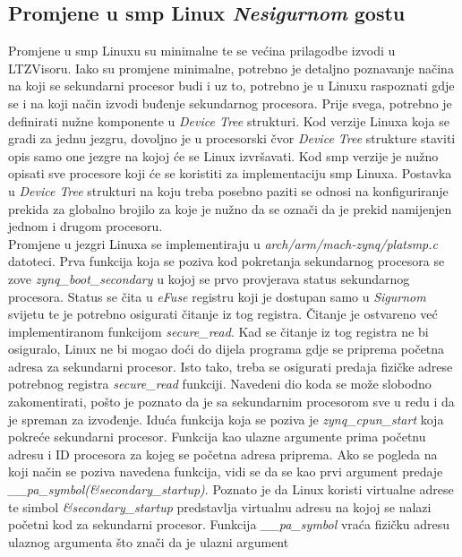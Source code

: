 \documentclass[times, utf8, diplomski, numeric]{fer}
\begin{document}
\subsection{Promjene u \gls{smp} Linux \textit{Nesigurnom} gostu}
Promjene u \gls{smp} Linuxu su minimalne te se većina prilagodbe izvodi u LTZVisoru. Iako su promjene minimalne, potrebno je detaljno
poznavanje načina na koji se sekundarni procesor budi i uz to, potrebno je u Linuxu raspoznati gdje se i na koji način izvodi
buđenje sekundarnog procesora. Prije svega, potrebno je definirati nužne komponente u \textit{Device Tree} strukturi. Kod
verzije Linuxa koja se gradi za jednu jezgru, dovoljno je u procesorski čvor \textit{Device Tree} strukture staviti opis
samo one jezgre na kojoj će se Linux izvršavati. Kod \gls{smp} verzije je nužno opisati sve procesore koji će se koristiti za
implementaciju \gls{smp} Linuxa. Postavka u \textit{Device Tree} strukturi na koju treba posebno paziti se odnosi na konfiguriranje
prekida za globalno brojilo za koje je nužno da se označi da je prekid namijenjen jednom i drugom procesoru.\\
Promjene u jezgri Linuxa se implementiraju u \textit{arch/arm/mach-zynq/platsmp.c} datoteci. Prva funkcija koja se poziva
kod pokretanja sekundarnog procesora se zove \textit{zynq\_boot\_secondary} u kojoj se prvo provjerava status sekundarnog
procesora. Status se čita u \textit{eFuse} registru koji je dostupan samo u \textit{Sigurnom} svijetu te je potrebno
osigurati čitanje iz tog registra. Čitanje je ostvareno već implementiranom funkcijom \textit{secure\_read}. Kad se čitanje
iz tog registra ne bi osiguralo, Linux ne bi mogao doći do dijela programa gdje se priprema početna adresa za sekundarni
procesor. Isto tako, treba se osigurati predaja fizičke adrese potrebnog registra \textit{secure\_read} funkciji. Navedeni
dio koda se može slobodno zakomentirati, pošto je poznato da je sa sekundarnim procesorom sve u redu i da je spreman za
izvođenje. Iduća funkcija koja se poziva je \textit{zynq\_cpun\_start} koja pokreće sekundarni procesor. Funkcija kao ulazne
argumente prima početnu adresu i ID procesora za kojeg se početna adresa priprema. Ako se pogleda na koji način se poziva
navedena funkcija, vidi se da se kao prvi argument predaje \textit{\_\_pa\_symbol(\&secondary\_startup)}. Poznato je da Linux
koristi virtualne adrese te simbol \textit{\&secondary\_startup} predstavlja virtualnu adresu na kojoj se nalazi početni kod
za sekundarni procesor. Funkcija \textit{\_\_pa\_symbol} vraća fizičku adresu ulaznog argumenta što znači da je ulazni argument
\end{document}

